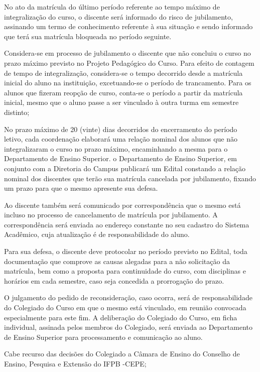 		No ato da matrícula do último período referente ao tempo máximo de integralização do curso, o discente será informado do risco de jubilamento, assinando um termo de conhecimento referente à sua situação e sendo informado que terá sua matrícula bloqueada no período seguinte.
		
		Considera-se em processo de jubilamento o discente que não concluiu o curso no prazo máximo previsto no Projeto Pedagógico do Curso. Para efeito de contagem de tempo de integralização, considera-se o tempo decorrido desde a matrícula inicial do aluno na instituição, excetuando-se o período de trancamento. Para os alunos que fizeram reopção de curso, conta-se o período a partir da matrícula inicial, mesmo que o aluno passe a ser vinculado à outra turma em semestre distinto;

		No prazo máximo de 20 (vinte) dias decorridos do encerramento do período letivo, cada coordenação elaborará uma relação nominal dos alunos que não integralizaram o curso no prazo máximo, encaminhando a mesma para o Departamento de Ensino Superior. o Departamento de Ensino Superior, em conjunto com a Diretoria do Campus publicará um Edital constando a relação nominal dos discentes que terão sua matrícula cancelada por jubilamento, fixando um prazo para que o mesmo apresente sua defesa.

		Ao discente também será comunicado por correspondência que o mesmo está incluso no processo de cancelamento de matrícula por jubilamento. A correspondência será enviada ao endereço constante no seu cadastro do Sistema Acadêmico, cuja atualização é de responsabilidade do aluno.

		Para sua defesa, o discente deve protocolar no período previsto no Edital, toda documentação que comprove as causas alegadas para a não solicitação da matrícula, bem como a proposta para continuidade do curso, com disciplinas e horários em cada semestre, caso seja concedida a prorrogação do prazo.

		O julgamento do pedido de reconsideração, caso ocorra, será de responsabilidade do Colegiado do Curso em que o mesmo está vinculado, em reunião convocada especialmente para este fim. A deliberação do Colegiado do Curso, em ficha individual, assinada pelos membros do Colegiado, será enviada ao Departamento de Ensino Superior para processamento e comunicação ao aluno.

		Cabe recurso das decisões do Colegiado a Câmara de Ensino do Conselho de Ensino, Pesquisa e Extensão do IFPB -CEPE;

